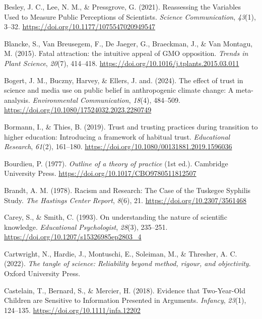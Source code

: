 \documentclass[
  jou,
  floatsintext,
  longtable,
  nolmodern,
  notxfonts,
  notimes,
  colorlinks=true,linkcolor=blue,citecolor=blue,urlcolor=blue]{apa7}
\newlength{\cslhangindent}
\newenvironment{CSLReferences}[2] %
 {\begin{list}{}{%
  \setlength{\itemindent}{0pt}
  \setlength{\leftmargin}{0pt}
  \setlength{\parsep}{0pt}
  \ifodd #1
   \setlength{\leftmargin}{\cslhangindent}
   \setlength{\itemindent}{-1\cslhangindent}
  \fi
  \setlength{\itemsep}{#2\baselineskip}}}
 {\end{list}}
\begin{document}
\begin{CSLReferences}{1}{0}
Besley, J. C., Lee, N. M., \& Pressgrove, G. (2021). Reassessing the
Variables Used to Measure Public Perceptions of Scientists.
\emph{Science Communication}, \emph{43}(1), 3--32.
\url{https://doi.org/10.1177/1075547020949547}

Blancke, S., Van Breusegem, F., De Jaeger, G., Braeckman, J., \& Van
Montagu, M. (2015). Fatal attraction: the intuitive appeal of GMO
opposition. \emph{Trends in Plant Science}, \emph{20}(7), 414--418.
\url{https://doi.org/10.1016/j.tplants.2015.03.011}

Bogert, J. M., Buczny, Harvey, \& Ellers, J. and. (2024). The effect of
trust in science and media use on public belief in anthropogenic climate
change: A meta-analysis. \emph{Environmental Communication},
\emph{18}(4), 484--509.
\url{https://doi.org/10.1080/17524032.2023.2280749}

Bormann, I., \& Thies, B. (2019). Trust and trusting practices during
transition to higher education: Introducing a framework of habitual
trust. \emph{Educational Research}, \emph{61}(2), 161--180.
\url{https://doi.org/10.1080/00131881.2019.1596036}

Bourdieu, P. (1977). \emph{Outline of a theory of practice} (1st ed.).
Cambridge University Press.
\url{https://doi.org/10.1017/CBO9780511812507}

Brandt, A. M. (1978). Racism and Research: The Case of the Tuskegee
Syphilis Study. \emph{The Hastings Center Report}, \emph{8}(6), 21.
\url{https://doi.org/10.2307/3561468}

Carey, S., \& Smith, C. (1993). On understanding the nature of
scientific knowledge. \emph{Educational Psychologist}, \emph{28}(3),
235--251. \url{https://doi.org/10.1207/s15326985ep2803_4}

Cartwright, N., Hardie, J., Montuschi, E., Soleiman, M., \& Thresher, A.
C. (2022). \emph{The tangle of science: Reliability beyond method,
rigour, and objectivity}. Oxford University Press.

Castelain, T., Bernard, S., \& Mercier, H. (2018). Evidence that
Two{-}Year{-}Old Children are Sensitive to Information Presented in
Arguments. \emph{Infancy}, \emph{23}(1), 124--135.
\url{https://doi.org/10.1111/infa.12202}


\end{CSLReferences}
\end{document}
